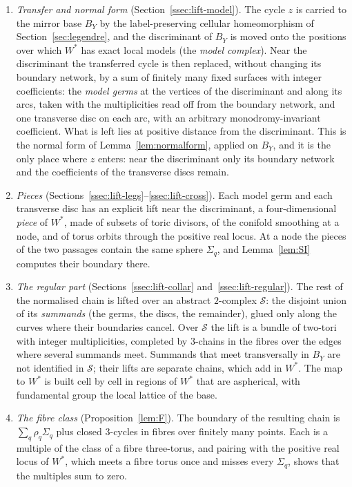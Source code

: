 \begin{enumerate}
\item \emph{Transfer and normal form} (Section~\ref{ssec:lift-model}). The cycle $z$ is carried to the mirror base $B_Y$ by
the label-preserving cellular homeomorphism of Section~\ref{sec:legendre}, and the discriminant of $B_Y$ is moved onto the positions over
which $W^*$ has exact local models (the \emph{model complex}). Near the discriminant the transferred cycle is then
replaced, without changing its boundary network, by a sum of finitely many fixed surfaces with integer coefficients: the
\emph{model germs} at the vertices of the discriminant and along its arcs, taken with the multiplicities read off from
the boundary network, and one transverse disc on each arc, with an arbitrary monodromy-invariant coefficient. What is
left lies at positive distance from the discriminant. This is the normal form of Lemma~\ref{lem:normalform}, applied on
$B_Y$, and it is the only place where $z$ enters: near the discriminant only its boundary network and the coefficients of
the transverse discs remain.
\item \emph{Pieces} (Sections~\ref{ssec:lift-legs}--\ref{ssec:lift-cross}). Each model germ and each transverse disc
has an explicit lift near the discriminant, a four-dimensional \emph{piece} of $W^*$, made of subsets of toric divisors,
of the conifold smoothing at a node, and of torus orbits through the positive real locus. At a node the pieces of the
two passages contain the same sphere $\Sigma_q$, and Lemma~\ref{lem:SI} computes their boundary there.
\item \emph{The regular part} (Sections~\ref{ssec:lift-collar} and~\ref{ssec:lift-regular}). The rest of the normalised
chain is lifted over an abstract $2$-complex $\mathscr S$: the disjoint union of its \emph{summands} (the germs, the
discs, the remainder), glued only along the curves where their boundaries cancel. Over $\mathscr S$ the lift is a
bundle of two-tori with integer multiplicities, completed by $3$-chains in the fibres over the edges where several
summands meet. Summands that meet transversally in $B_Y$ are not identified in $\mathscr S$; their lifts are
separate chains, which add in $W^*$. The map to $W^*$ is built cell by cell in regions of $W^*$ that are aspherical,
with fundamental group the local lattice of the base.
\item \emph{The fibre class} (Proposition~\ref{lem:F}). The boundary of the resulting chain is $\sum_q\rho_q\Sigma_q$ plus
closed $3$-cycles in fibres over finitely many points. Each is a multiple of the class of a fibre three-torus, and
pairing with the positive real locus of $W^*$, which meets a fibre torus once and misses every $\Sigma_q$, shows that
the multiples sum to zero.
\end{enumerate}

